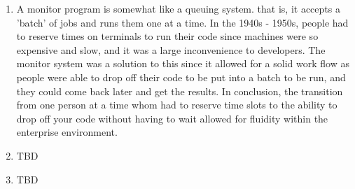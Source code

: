 \documentclass[12pt]{article}
\begin{document}
\begin{enumerate}
	\item A monitor program is somewhat like a queuing system. that is, it accepts a 			'batch' of jobs and runs them one at a time. In the 1940s - 1950s, people had to 			reserve times on terminals to run their code since machines were so expensive and 			slow, and it was a large inconvenience to developers. The monitor system was a 				solution to this since it allowed for a solid work flow as people were able to drop 		off their code to be put into a batch to be run, and they could come back later and 		get the results. In conclusion, the 	transition from one person at a time whom had 		to reserve time slots to the ability to drop 	off your code without having to wait 		allowed for fluidity within the enterprise environment.

	\item TBD

	\item TBD
	
\end{enumerate}
	
\end{document}
